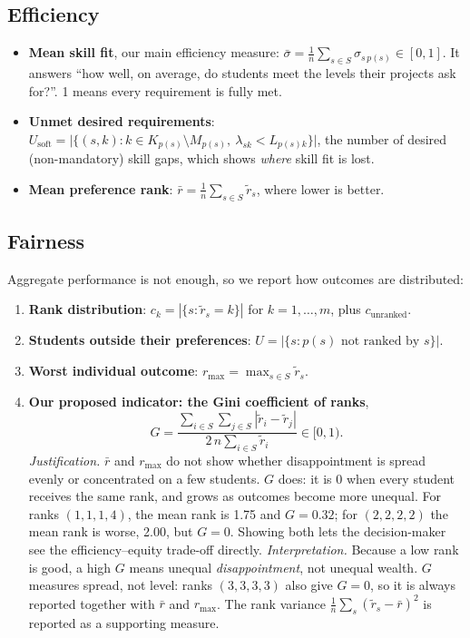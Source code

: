 \documentclass[11pt,a4paper]{article}
\begin{document}
\subsection{Efficiency}
\begin{itemize}
  \item \textbf{Mean skill fit}, our main efficiency measure:
        $\bar\sigma = \frac1n \sum_{s \in S} \sigma_{s\,p(s)} \in [0,1]$.
        It answers ``how well, on average, do students meet the levels their
        projects ask for?''. 1 means every requirement is fully met.
  \item \textbf{Unmet desired requirements}:
        $U_{\text{soft}} = \bigl|\{(s,k) : k \in K_{p(s)} \setminus M_{p(s)},\
        \lambda_{sk} < L_{p(s)k}\}\bigr|$, the number of desired (non-mandatory)
        skill gaps, which shows \emph{where} skill fit is lost.
  \item \textbf{Mean preference rank}:
        $\bar r = \frac1n \sum_{s \in S} \tilde r_s$, where lower is better.
\end{itemize}

\subsection{Fairness}
Aggregate performance is not enough, so we report how outcomes are
distributed:
\begin{enumerate}
  \item \textbf{Rank distribution}: $c_k = |\{s : \tilde r_s = k\}|$ for
        $k = 1,\dots,m$, plus $c_{\text{unranked}}$.
  \item \textbf{Students outside their preferences}:
        $U = |\{s : p(s) \text{ not ranked by } s\}|$.
  \item \textbf{Worst individual outcome}: $r_{\max} = \max_{s \in S} \tilde r_s$.
  \item \textbf{Our proposed indicator: the Gini coefficient of ranks},
        \begin{equation}
          G = \frac{\sum_{i \in S} \sum_{j \in S} |\tilde r_i - \tilde r_j|}
                   {2\, n \sum_{i \in S} \tilde r_i} \in [0, 1).
          \label{eq:gini}
        \end{equation}
        \emph{Justification.} $\bar r$ and $r_{\max}$ do not show whether
        disappointment is spread evenly or concentrated on a few students.
        $G$ does: it is 0 when every student receives the same rank, and
        grows as outcomes become more unequal. For ranks $(1,1,1,4)$, the mean
        rank is 1.75 and $G = 0.32$; for $(2,2,2,2)$ the mean rank is worse,
        2.00, but $G = 0$. Showing both lets the decision-maker see the
        efficiency--equity trade-off directly.
        \emph{Interpretation.} Because a low rank is good, a high $G$ means
        unequal \emph{disappointment}, not unequal wealth. $G$ measures
        spread, not level: ranks $(3,3,3,3)$ also give $G = 0$, so it is
        always reported together with $\bar r$ and $r_{\max}$.
        The rank variance $\frac1n \sum_s (\tilde r_s - \bar r)^2$ is
        reported as a supporting measure.
\end{enumerate}
\end{document}
